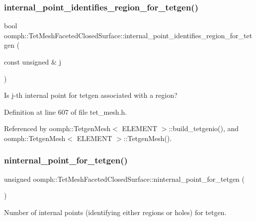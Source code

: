 \subsubsection{\texorpdfstring{internal\+\_\+point\+\_\+identifies\+\_\+region\+\_\+for\+\_\+tetgen()}{internal\_point\_identifies\_region\_for\_tetgen()}}
{\footnotesize\ttfamily bool oomph\+::\+Tet\+Mesh\+Faceted\+Closed\+Surface\+::internal\+\_\+point\+\_\+identifies\+\_\+region\+\_\+for\+\_\+tetgen (\begin{DoxyParamCaption}\item[{const unsigned \&}]{j }\end{DoxyParamCaption})\hspace{0.3cm}{\ttfamily [inline]}}



Is j-\/th internal point for tetgen associated with a region? 



Definition at line 607 of file tet\+\_\+mesh.\+h.



Referenced by oomph\+::\+Tetgen\+Mesh$<$ E\+L\+E\+M\+E\+N\+T $>$\+::build\+\_\+tetgenio(), and oomph\+::\+Tetgen\+Mesh$<$ E\+L\+E\+M\+E\+N\+T $>$\+::\+Tetgen\+Mesh().

\mbox{\label{classoomph_1_1TetMeshFacetedClosedSurface_a69fbedd3beddfc55c8bcb7f0e186ec38}} 
\subsubsection{\texorpdfstring{ninternal\+\_\+point\+\_\+for\+\_\+tetgen()}{ninternal\_point\_for\_tetgen()}}
{\footnotesize\ttfamily unsigned oomph\+::\+Tet\+Mesh\+Faceted\+Closed\+Surface\+::ninternal\+\_\+point\+\_\+for\+\_\+tetgen (\begin{DoxyParamCaption}{ }\end{DoxyParamCaption})\hspace{0.3cm}{\ttfamily [inline]}}



Number of internal points (identifying either regions or holes) for tetgen. 



